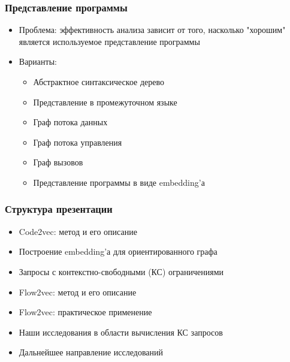 \documentclass[xcolor=table,english]{beamer}
\begin{document}
\begin{frame}[fragile] \frametitle{Представление программы}
    \begin{itemize}
        \item Проблема: эффективность анализа зависит от того, насколько "хорошим" является используемое представление программы
        \item Варианты: 
        {
            \begin{itemize}
                \item Абстрактное синтаксическое дерево
                \item Представление в промежуточном языке
                \item Граф потока данных
                \item Граф потока управления
                \item Граф вызовов
                \item Представление программы в виде embedding'а
            \end{itemize}
        }
    \end{itemize}
\end{frame}

\begin{frame}[fragile] \frametitle{Структура презентации}
    \begin{itemize}
        \item Code2vec: метод и его описание
        \item Построение embedding'а для ориентированного графа
        \item Запросы с контекстно-свободными (КС) ограничениями
        \item Flow2vec: метод и его описание
        \item Flow2vec: практическое применение
        \item Наши исследования в области вычисления КС запросов
        \item Дальнейшее направление исследований  
    \end{itemize}
\end{frame}
\end{document}
